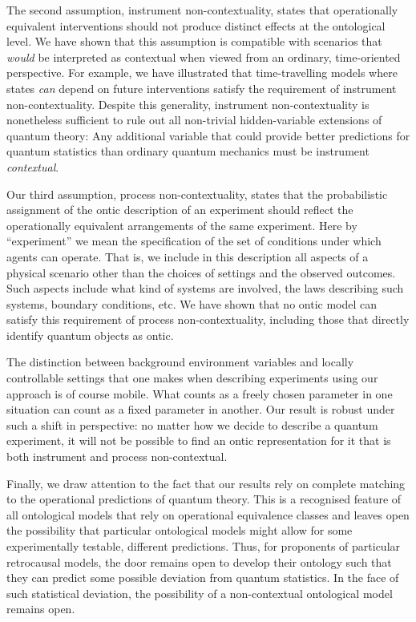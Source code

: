 \documentclass[a4paper,onecolumn,11pt,accepted=2018-05-04]{quantumarticle}
\begin{document}
The second assumption, instrument non-contextuality, states that operationally equivalent interventions should not produce distinct effects at the ontological level. We have shown that this assumption is compatible with scenarios that \emph{would} be interpreted as contextual when viewed from an ordinary, time-oriented perspective. For example, we have illustrated that time-travelling models where states \emph{can} depend on future interventions satisfy the requirement of instrument non-contextuality. Despite this generality, instrument non-contextuality is nonetheless sufficient to rule out all non-trivial hidden-variable extensions of quantum theory: 
Any additional variable that could provide better predictions for quantum statistics than ordinary quantum mechanics must be instrument \emph{contextual}.

Our third assumption, process non-contextuality, states that the probabilistic assignment of the ontic description of an experiment should reflect the operationally equivalent arrangements of the same experiment. Here by ``experiment'' we mean the specification of the set of conditions under which agents can operate. That is, we include in this description all aspects of a physical scenario other than the choices of settings and the observed outcomes. Such aspects include what kind of systems are involved, the laws describing such systems, boundary conditions, etc. We have shown that no ontic model can satisfy this requirement of process non-contextuality, including those that directly identify quantum objects as ontic. 

The distinction between background environment variables and locally controllable settings  that one makes when describing experiments using our approach is of course mobile. What counts as a freely chosen parameter in one situation can count as a fixed parameter in another. Our result is robust under such a shift in perspective: no matter how we decide to describe a quantum experiment, it will not be possible to find an ontic representation for it that is both instrument and process non-contextual.


Finally, we draw attention to the fact that our results rely on complete matching to the operational predictions of quantum theory. This is a recognised feature of all ontological models that rely on operational equivalence classes and leaves open the possibility that particular ontological models might allow for some experimentally testable, different predictions. Thus, for proponents of particular retrocausal models, the door remains open to develop their ontology such that they can predict some possible deviation from quantum statistics. In the face of such statistical deviation, the possibility of a non-contextual ontological model remains open.
\end{document}

